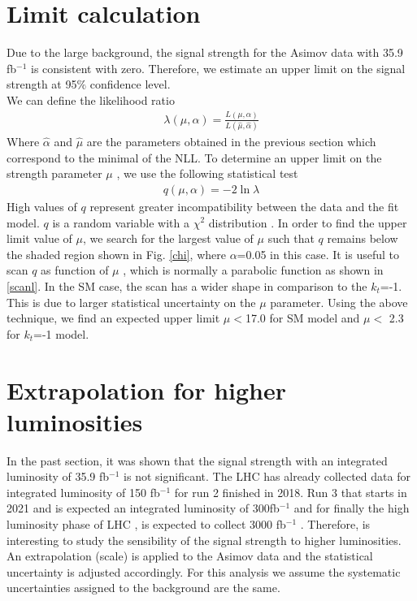	\pagebreak
	\section{Limit calculation}
	Due to the large background, the signal strength for the Asimov data with 35.9 fb$^{-1}$ is consistent with zero.
	Therefore, we estimate an upper limit on the signal strength at 95$\%$  confidence level.\\
	
	We can define the likelihood ratio
	\begin{align}
		\lambda(\mu,\alpha)=\frac{L(\mu,\alpha)}{L(\hat{\mu},\hat{\alpha})}
	\end{align}
	Where $\hat{\alpha}$ and $\hat{\mu}$ are the parameters obtained in the previous section which correspond to the minimal of the NLL.
	To determine an upper limit on the strength parameter $\mu$ , we use the following statistical test
	\begin{align}
		q(\mu,\alpha)= -2\ln{\lambda} 
	\end{align}
	High values of $q$ represent greater incompatibility between the data and the fit model.
	$q$ is a random variable with a $\chi^2$ distribution \cite{asimov}.
	In order to find the upper limit value of $\mu$, we search for the largest value of $\mu$  such that $q$ remains below the shaded region shown in Fig. \ref{chi}, where $\alpha$=0.05 in this case. 
	It is useful to scan $q$ as function of $\mu$ , which is normally a parabolic function as shown in \ref{scanl}. In the SM case, the scan has a wider shape in comparison to the $k_t$=-1. This is due to larger statistical uncertainty on the $\mu$ parameter. 
	Using the above technique, we find an expected upper limit $\mu < $17.0 for SM model and $\mu < $ 2.3 for $k_t$=-1 model. 
	
	
	
	
	\section{Extrapolation for higher luminosities}
	In the past section, it was shown that the signal strength  with an integrated luminosity of 35.9 fb$^{-1}$ is not significant. The LHC has already collected data for integrated luminosity of 150 fb$^{-1}$ for run 2 finished in 2018. Run 3 that starts in 2021 and is expected an integrated luminosity of 300fb$^{-1}$ and for finally the high luminosity phase of LHC , is expected to collect 3000 fb$^{-1}$ . Therefore, is interesting to study the sensibility of the signal  strength to higher luminosities. 
	An extrapolation (scale) is applied to the Asimov data and the statistical uncertainty is adjusted accordingly. For this analysis we assume the systematic uncertainties assigned to the background are the same.
	\\
	
